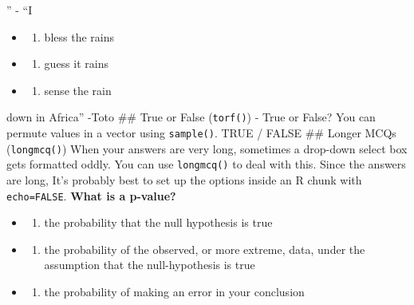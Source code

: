 \documentclass[
]{book}
\providecommand{\tightlist}{%
  \setlength{\itemsep}{0pt}\setlength{\parskip}{0pt}}
\begin{document}
''
- ``I

\begin{itemize}
\tightlist
\item
  \begin{enumerate}
  \def\labelenumi{(\Alph{enumi})}
  \tightlist
  \item
    bless the rains\\
  \end{enumerate}
\item
  \begin{enumerate}
  \def\labelenumi{(\Alph{enumi})}
  \setcounter{enumi}{1}
  \tightlist
  \item
    guess it rains\\
  \end{enumerate}
\item
  \begin{enumerate}
  \def\labelenumi{(\Alph{enumi})}
  \setcounter{enumi}{2}
  \tightlist
  \item
    sense the rain
  \end{enumerate}
\end{itemize}

down in Africa'' -Toto
\#\# True or False (\texttt{torf()})
- True or False? You can permute values in a vector using \texttt{sample()}. TRUE / FALSE
\#\# Longer MCQs (\texttt{longmcq()})
When your answers are very long, sometimes a drop-down select box gets formatted oddly. You can use \texttt{longmcq()} to deal with this. Since the answers are long, It's probably best to set up the options inside an R chunk with \texttt{echo=FALSE}.
\textbf{What is a p-value?}

\begin{itemize}
\tightlist
\item
  \begin{enumerate}
  \def\labelenumi{(\Alph{enumi})}
  \tightlist
  \item
    the probability that the null hypothesis is true\\
  \end{enumerate}
\item
  \begin{enumerate}
  \def\labelenumi{(\Alph{enumi})}
  \setcounter{enumi}{1}
  \tightlist
  \item
    the probability of the observed, or more extreme, data, under the assumption that the null-hypothesis is true\\
  \end{enumerate}
\item
  \begin{enumerate}
  \def\labelenumi{(\Alph{enumi})}
  \setcounter{enumi}{2}
  \tightlist
  \item
    the probability of making an error in your conclusion
  \end{enumerate}
\end{itemize}

  
\end{document}
